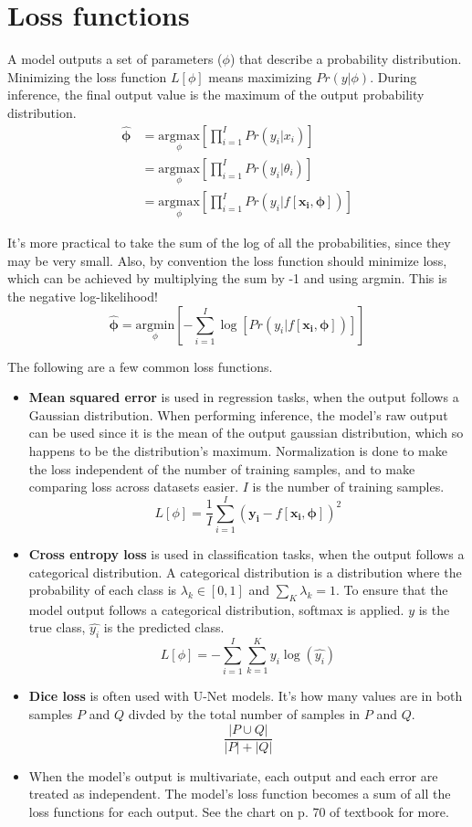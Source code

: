 \documentclass{article}
\begin{document}
\section{Loss functions}
A model outputs a set of parameters ($\phi$) that describe a probability distribution. Minimizing the loss function $L[\phi]$ means maximizing $Pr(y|\phi)$. During inference, the final output value is the maximum of the output probability distribution.
\begin{align*}
\boldsymbol{\hat{\phi}} &= \underset{\phi}{\text{argmax}}\left[\prod_{i = 1}^{I} Pr(y_i|x_i)\right]\\
                        &= \underset{\phi}{\text{argmax}}\left[\prod_{i = 1}^{I} Pr(y_i|\theta_i)\right]\\
                        &= \underset{\phi}{\text{argmax}}\left[\prod_{i = 1}^{I} Pr(y_i|f[\mathbf{x_i}, \boldsymbol{\phi}])\right]
\end{align*}

It's more practical to take the sum of the log of all the probabilities, since they may be very small. Also, by convention the loss function should minimize loss, which can be achieved by multiplying the sum by -1 and using argmin. This is the negative log-likelihood!
\[ \boldsymbol{\hat{\phi}} = \underset{\phi}{\text{argmin}}\left[-\sum_{i = 1}^{I} \log[Pr(y_i|f[\mathbf{x_i}, \boldsymbol{\phi}])]\right] \]

The following are a few common loss functions.
\begin{itemize}
\item \textbf{Mean squared error} is used in regression tasks, when the output follows a Gaussian distribution. When performing inference, the model's raw output can be used since it is the mean of the output gaussian distribution, which so happens to be the distribution's maximum. Normalization is done to make the loss independent of the number of training samples, and to make comparing loss across datasets easier. $I$ is the number of training samples.
\[ L[\phi] = \frac{1}{I} \sum_{i = 1}^{I} (\mathbf{y_i} - f[\mathbf{x_i}, \boldsymbol{\phi}])^2 \]

\item \textbf{Cross entropy loss} is used in classification tasks, when the output follows a categorical distribution. A categorical distribution is a distribution where the probability of each class is $\lambda_k \in [0, 1]$ and $\sum_{K} \lambda_k = 1$. To ensure that the model output follows a categorical distribution, softmax is applied. $y$ is the true class, $\hat{y_i}$ is the predicted class.
\[ L[\phi] = -\sum_{i = 1}^{I}\sum_{k=1}^{K} y_i \log(\hat{y_i}) \]

\item \textbf{Dice loss} is often used with U-Net models. It's how many values are in both samples $P$ and $Q$ divded by the total number of samples in $P$ and $Q$.
\[ \frac{|P \cup Q|}{|P| + |Q|} \]

\item When the model's output is multivariate, each output and each error are treated as independent. The model's loss function becomes a sum of all the loss functions for each output. See the chart on p. 70 of textbook for more.
\end{itemize}
\end{document}
